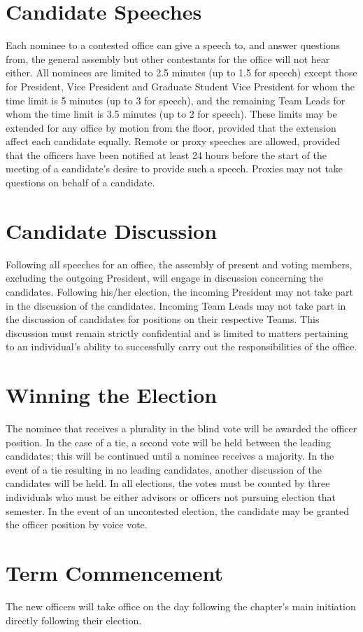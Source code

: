 \section{Candidate Speeches} Each nominee to a contested office can give a speech to, and answer questions from, the general assembly but other contestants for the office will not hear either. All nominees are limited to 2.5 minutes (up to 1.5 for speech) except those for President,  Vice President and Graduate Student Vice President for whom the time limit is 5 minutes (up to 3 for speech), and the remaining Team Leads for whom the time limit is 3.5 minutes (up to 2 for speech). These limits may be extended for any office by motion from the floor, provided that the extension affect each candidate equally. Remote or proxy speeches are allowed, provided that the officers have been notified at least 24 hours before the start of the meeting of a candidate's desire to provide such a speech. Proxies may not take questions on behalf of a candidate.
\section{Candidate Discussion} Following all speeches for an office, the assembly of present and voting members, excluding the outgoing President, will engage in discussion concerning the candidates.  Following his/her election, the incoming President may not take part in the discussion of the candidates. Incoming Team Leads may not take part in the discussion of candidates for positions on their respective Teams. This discussion must remain strictly confidential and is limited to matters pertaining to an individual's ability to successfully carry out the responsibilities of the office. 
\section{Winning the Election} The nominee that receives a plurality in the blind vote will be awarded the officer position.  In the case of a tie, a second vote will be held between the leading candidates; this will be continued until a nominee receives a majority.  In the event of a tie resulting in no leading candidates, another discussion of the candidates will be held. In all elections, the votes must be counted by three individuals who must be either advisors or officers not pursuing election that semester.  In the event of an uncontested election, the candidate may be granted the officer position by voice vote.  
\section{Term Commencement} The new officers will take office on the day following the chapter's main initiation directly following their election.
